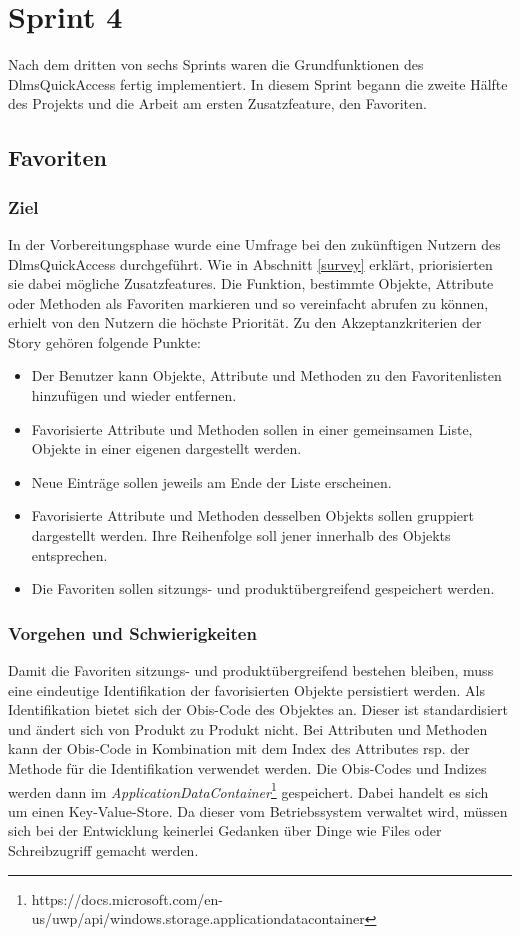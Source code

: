 \section{Sprint 4}\label{sprint4}
Nach dem dritten von sechs Sprints waren die Grundfunktionen des DlmsQuickAccess fertig implementiert.
In diesem Sprint begann die zweite Hälfte des Projekts und die Arbeit am ersten Zusatzfeature, den Favoriten.


\subsection{Favoriten}

\subsubsection{Ziel}
In der Vorbereitungsphase wurde eine Umfrage bei den zukünftigen Nutzern des DlmsQuickAccess durchgeführt.
Wie in Abschnitt \ref{survey} erklärt, priorisierten sie dabei mögliche Zusatzfeatures.
Die Funktion, bestimmte Objekte, Attribute oder Methoden als Favoriten markieren und so vereinfacht abrufen zu können, erhielt von den Nutzern die höchste Priorität.
Zu den Akzeptanzkriterien der Story gehören folgende Punkte:
\begin{itemize}
   \item Der Benutzer kann Objekte, Attribute und Methoden zu den Favoritenlisten hinzufügen und wieder entfernen.
   \item Favorisierte Attribute und Methoden sollen in einer gemeinsamen Liste, Objekte in einer eigenen dargestellt werden.
   \item Neue Einträge sollen jeweils am Ende der Liste erscheinen.
   \item Favorisierte Attribute und Methoden desselben Objekts sollen gruppiert dargestellt werden. Ihre Reihenfolge soll jener innerhalb des Objekts entsprechen.
   \item Die Favoriten sollen sitzungs- und produktübergreifend gespeichert werden.
\end{itemize}


\subsubsection{Vorgehen und Schwierigkeiten}
Damit die Favoriten  sitzungs- und produktübergreifend bestehen bleiben, muss eine eindeutige Identifikation der favorisierten Objekte persistiert werden.
Als Identifikation bietet sich der \ac{Obis}-Code des Objektes an.
Dieser ist standardisiert und ändert sich von Produkt zu Produkt nicht.
Bei Attributen und Methoden kann der \ac{Obis}-Code in Kombination mit dem Index des Attributes rsp. der Methode für die Identifikation verwendet werden.
Die \ac{Obis}-Codes und Indizes werden dann im \textit{ApplicationDataContainer}\footnote{https://docs.microsoft.com/en-us/uwp/api/windows.storage.applicationdatacontainer} gespeichert.
Dabei handelt es sich um einen Key-Value-Store.
Da dieser vom Betriebssystem verwaltet wird, müssen sich bei der Entwicklung keinerlei Gedanken über Dinge wie Files oder Schreibzugriff gemacht werden.

